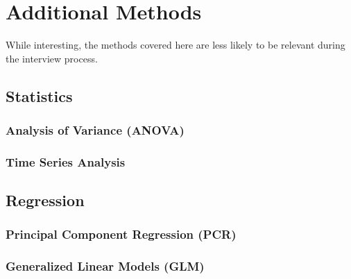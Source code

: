 \chapter{Additional Methods}
\label{additional}

While interesting, the methods covered here are less likely
to be relevant during the interview process.

\section{Statistics}
\label{additional:stats}

\subsection{Analysis of Variance (ANOVA)}
\label{additional:stats:ANOVA}

\subsection{Time Series Analysis}
\label{additional:stats:time_series_ana}

\section{Regression}
\label{additional:Regression}

\subsection{Principal Component Regression (PCR)}
\label{additional:Regression:PCR}

\subsection{Generalized Linear Models (GLM)}
\label{additional:Regression:GLM}

